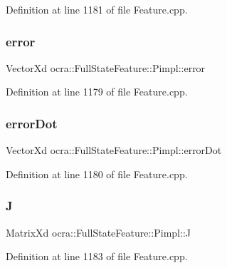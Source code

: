 Definition at line 1181 of file Feature.\+cpp.

\hypertarget{structocra_1_1FullStateFeature_1_1Pimpl_a37accc4269498c113d450b0106115274}{}\label{structocra_1_1FullStateFeature_1_1Pimpl_a37accc4269498c113d450b0106115274} 
\subsubsection{\texorpdfstring{error}{error}}
{\footnotesize\ttfamily Vector\+Xd ocra\+::\+Full\+State\+Feature\+::\+Pimpl\+::error}



Definition at line 1179 of file Feature.\+cpp.

\hypertarget{structocra_1_1FullStateFeature_1_1Pimpl_aea594214dbcf9bd9c7fb28b16593df7e}{}\label{structocra_1_1FullStateFeature_1_1Pimpl_aea594214dbcf9bd9c7fb28b16593df7e} 
\subsubsection{\texorpdfstring{error\+Dot}{errorDot}}
{\footnotesize\ttfamily Vector\+Xd ocra\+::\+Full\+State\+Feature\+::\+Pimpl\+::error\+Dot}



Definition at line 1180 of file Feature.\+cpp.

\hypertarget{structocra_1_1FullStateFeature_1_1Pimpl_aaf69c11e2ad69ab31c1b6614dec068bd}{}\label{structocra_1_1FullStateFeature_1_1Pimpl_aaf69c11e2ad69ab31c1b6614dec068bd} 
\subsubsection{\texorpdfstring{J}{J}}
{\footnotesize\ttfamily Matrix\+Xd ocra\+::\+Full\+State\+Feature\+::\+Pimpl\+::J}



Definition at line 1183 of file Feature.\+cpp.

